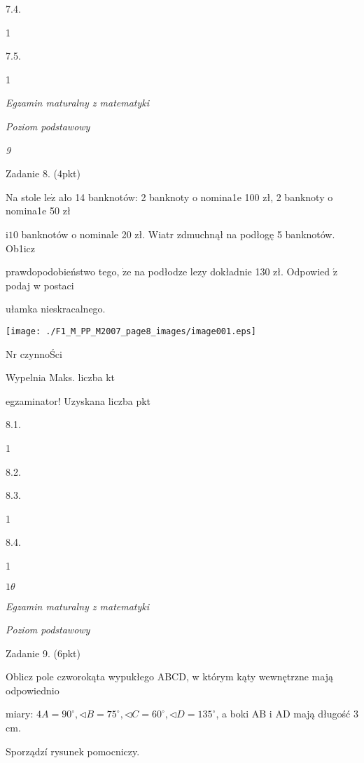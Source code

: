 \documentclass[a4paper,12pt]{article}
\begin{document}
7.4.

1

7.5.

1





{\it Egzamin maturalny z matematyki}

{\it Poziom podstawowy}

{\it 9}

Zadanie 8. (4pkt)

Na stole $\mathrm{l}\mathrm{e}\dot{\mathrm{z}}$ ało 14 banknotów: 2 banknoty o nomina1e 100 zł, 2 banknoty o nomina1e 50 zł

$\mathrm{i} 10$ banknotów o nominale 20 zł. Wiatr zdmuchnął na podłogę 5 banknotów. Ob1icz

prawdopodobieństwo tego, $\dot{\mathrm{z}}\mathrm{e}$ na podłodze lezy dokładnie 130 zł. Odpowied $\acute{\mathrm{z}}$ podaj w postaci

ułamka nieskracalnego.
\begin{center}
\texttt{[image: ./F1\_M\_PP\_M2007\_page8\_images/image001.eps]}
\end{center}
Nr czynnoŚci

Wypelnia Maks. liczba kt

egzaminator! Uzyskana liczba pkt

8.1.

1

8.2.

8.3.

1

8.4.

1





$ 1\theta$

{\it Egzamin maturalny z matematyki}

{\it Poziom podstawowy}

Zadanie 9. (6pkt)

Oblicz pole czworokąta wypukłego ABCD, w którym kąty wewnętrzne mają odpowiednio

miary: $4A=90^{\circ}, \triangleleft B=75^{\circ}, \triangleleft C=60^{\circ}, \triangleleft D=135^{\circ}$, a boki AB $\mathrm{i}$ AD mają długość 3 cm.

Sporządzí rysunek pomocniczy.
\end{document}
